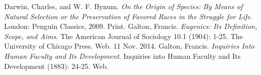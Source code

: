 \documentclass[11pt, oneside]{article}
\begin{document}
\par

\begin{thebibliography}{9}
  Darwin, Charles, and W. F. Bynum.
  \emph{On the Origin of Species: By Means of Natural Selection or the Preservation of Favored Races in the Struggle for Life}.
  London: Penguin Classics, 2009.
  Print.
  Galton, Francis.
  \emph{Eugenics: Its Definition, Scope, and Aims}.
  The American Journal of Sociology 10.1 (1904): 1-25.
  The University of Chicago Press. Web. 11 Nov. 2014.
  Galton, Francis.
  \emph{Inquiries Into Human Faculty and Its Development}.
  Inquiries into Human Faculty and Its Development (1883): 24-25. 
  Web.
\end{thebibliography}
\end{document}
